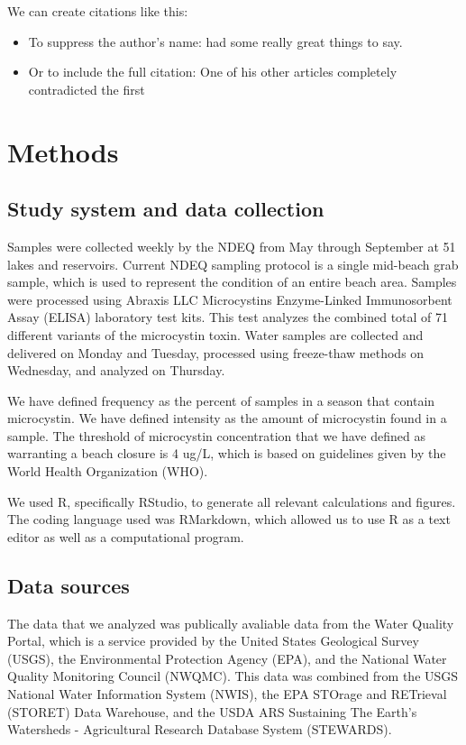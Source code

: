 \documentclass[11pt,]{article}
\providecommand{\tightlist}{%
\setlength{\itemsep}{0pt}\setlength{\parskip}{0pt}}
\begin{document}
We can create citations like this:

\begin{itemize}
\tightlist
\item
  To suppress the author's name: \citet{smith2017a} had some really
  great things to say.
\item
  Or to include the full citation: One of his other articles completely
  contradicted the first \citep{smith2017b}
\end{itemize}

\section{Methods}\label{methods}

\subsection{Study system and data
collection}\label{study-system-and-data-collection}

Samples were collected weekly by the NDEQ from May through September at
51 lakes and reservoirs. Current NDEQ sampling protocol is a single
mid-beach grab sample, which is used to represent the condition of an
entire beach area. Samples were processed using Abraxis LLC Microcystins
Enzyme-Linked Immunosorbent Assay (ELISA) laboratory test kits. This
test analyzes the combined total of 71 different variants of the
microcystin toxin. Water samples are collected and delivered on Monday
and Tuesday, processed using freeze-thaw methods on Wednesday, and
analyzed on Thursday.

We have defined frequency as the percent of samples in a season that
contain microcystin. We have defined intensity as the amount of
microcystin found in a sample. The threshold of microcystin
concentration that we have defined as warranting a beach closure is 4
ug/L, which is based on guidelines given by the World Health
Organization (WHO).

We used R, specifically RStudio, to generate all relevant calculations
and figures. The coding language used was RMarkdown, which allowed us to
use R as a text editor as well as a computational program.

\subsection{Data sources}\label{data-sources}

The data that we analyzed was publically avaliable data from the Water
Quality Portal, which is a service provided by the United States
Geological Survey (USGS), the Environmental Protection Agency (EPA), and
the National Water Quality Monitoring Council (NWQMC). This data was
combined from the USGS National Water Information System (NWIS), the EPA
STOrage and RETrieval (STORET) Data Warehouse, and the USDA ARS
Sustaining The Earth's Watersheds - Agricultural Research Database
System (STEWARDS).
\end{document}
